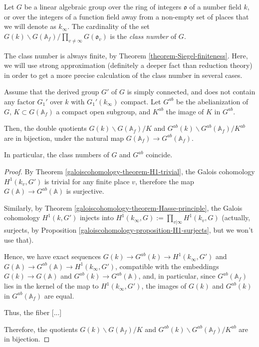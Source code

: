 \begin{definition}
 \label{definition-class-number}
 Let $G$ be a linear algebraic group over the ring of integers $\mathfrak o$ of a number field $k$, or over the integers of a function field away from a non-empty set of places that we will denote as $k_\infty$. The cardinality of the set $G(k)\backslash G(\mathbb A_f)/\prod_{v\ne \infty} G(\mathfrak o_v)$ is the {\it class number} of $G$. 
\end{definition}

The class number is always finite, by Theorem \ref{theorem-Siegel-finiteness}. Here, we will use strong approximation (definitely a deeper fact than reduction theory) in order to get a more precise calculation of the class number in several cases.

\begin{proposition}
\label{proposition-class-number-abelianization}
Assume that the derived group $G'$ of $G$ is simply connected, and does not contain any factor $G_1'$ over $k$ with $G_1'(k_\infty)$ compact. Let $G^{ab}$ be the abelianization of $G$, $K\subset G(\mathbb A_f)$ a compact open subgroup, and $K^{ab}$ the image of $K$ in $G^{ab}$. 

Then, the double quotients $G(k)\backslash G(\mathbb A_f)/K$ and $G^{ab}(k)\backslash G^{ab}(\mathbb A_f)/K^{ab}$ are in bijection, under the natural map $G(\mathbb A_f)\to G^{ab}(\mathbb A_f)$.

In particular, the class numbers of $G$ and $G^{ab}$ coincide.
\end{proposition}

\begin{proof}
 By Theorem \ref{galoiscohomology-theorem-H1-trivial}, the Galois cohomology $H^1(k_v, G')$ is trivial for any finite place $v$, therefore the map $G(\mathbb A)\to G^{ab}(\mathbb A)$ is surjective. 
 
 Similarly, by Theorem \ref{galoiscohomology-theorem-Hasse-principle}, the Galois cohomology $H^1(k, G')$ injects into $H^1(k_\infty, G) := \prod_{v|\infty} H^1(k_v, G)$ (actually, surjects, by Proposition \ref{galoiscohomology-proposition-H1-surjects}, but we won't use that).
 
 Hence, we have exact sequences $G(k)\to G^{ab}(k) \to H^1(k_\infty, G')$ and $G(\mathbb A)\to G^{ab}(\mathbb A) \to H^1(k_\infty,G')$, compatible with the embeddings $G(k)\to G(\mathbb A)$ and $G^{ab}(k)\to G^{ab}(\mathbb A)$, and, in particular, since $G^{ab}(\mathbb A_f)$ lies in the kernel of the map to $H^1(k_\infty, G')$, the images of $G(k)$ and $G^{ab}(k)$ in $G^{ab}(\mathbb A_f)$ are equal. 
 
 Thus, the fiber [...]
 
 Therefore, the quotients $G(k)\backslash G(\mathbb A_f)/K$ and $G^{ab}(k)\backslash G^{ab}(\mathbb A_f)/K^{ab}$ are in bijection.
\end{proof}


